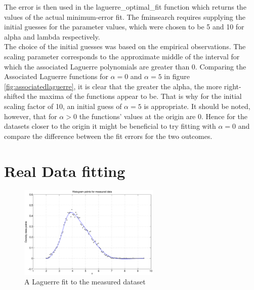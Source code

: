 \documentclass[a4paper]{article}
\numberwithin{equation}{section}
\begin{document}


\noindent The error is then used in the laguerre\_optimal\_fit function which returns the values of the actual minimum-error fit. The fminsearch requires supplying the initial guesses for the parameter values, which were chosen to be 5 and 10 for alpha and lambda respectively. \\

\noindent The choice of the initial guesses was based on the empirical observations. The scaling parameter corresponds to the approximate middle of the interval for which the associated Laguerre polynomials are greater than 0.
Comparing the Associated Laguerre functions for $\alpha = 0$ and $\alpha = 5$ in figure \ref{fig:associatedlaguerre}, it is clear that the greater the alpha, the more right-shifted the maxima of the functions appear to be. That is why for the initial scaling factor of 10, an initial guess of $\alpha = 5$ is appropriate. It should be noted, however, that for $\alpha > 0$ the functions' values at the origin are 0. Hence for the datasets closer to the origin it might be beneficial to try fitting with $\alpha = 0$ and compare the difference between the fit errors for the two outcomes.



\section{Real Data fitting}

\begin{figure}[!h]
\centering
\includegraphics[width=0.6\textwidth]{real_data_fit.eps}
\caption{\label{fig:realdataset}A Laguerre fit to the measured dataset}
\end{figure}
\end{document}
